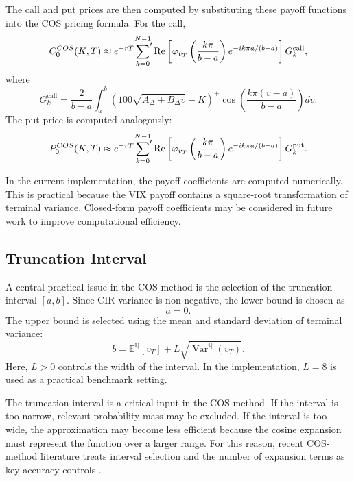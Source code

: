 The call and put prices are then computed by substituting these payoff functions into the COS pricing formula. For the call,
\begin{equation}
C_0^{COS}(K,T)
\approx
e^{-rT}
\sideset{}{'}\sum_{k=0}^{N-1}
\operatorname{Re}
\left[
\varphi_{v_T}\left(\frac{k\pi}{b-a}\right)
e^{-ik\pi a/(b-a)}
\right]
G_k^{\mathrm{call}},
\label{eq:cos_call_price}
\end{equation}
where
\begin{equation}
G_k^{\mathrm{call}}
=
\frac{2}{b-a}
\int_a^b
\left(
100\sqrt{A_\Delta+B_\Delta v}-K
\right)^+
\cos\left(
\frac{k\pi(v-a)}{b-a}
\right)
dv.
\end{equation}
The put price is computed analogously:
\begin{equation}
P_0^{COS}(K,T)
\approx
e^{-rT}
\sideset{}{'}\sum_{k=0}^{N-1}
\operatorname{Re}
\left[
\varphi_{v_T}\left(\frac{k\pi}{b-a}\right)
e^{-ik\pi a/(b-a)}
\right]
G_k^{\mathrm{put}}.
\label{eq:cos_put_price}
\end{equation}

In the current implementation, the payoff coefficients are computed numerically. This is practical because the VIX payoff contains a square-root transformation of terminal variance. Closed-form payoff coefficients may be considered in future work to improve computational efficiency.

\subsection{Truncation Interval}

A central practical issue in the COS method is the selection of the truncation interval \([a,b]\). Since CIR variance is non-negative, the lower bound is chosen as
\begin{equation}
a=0.
\end{equation}
The upper bound is selected using the mean and standard deviation of terminal variance:
\begin{equation}
b
=
\mathbb{E}^{\mathbb{Q}}[v_T]
+
L\sqrt{\operatorname{Var}^{\mathbb{Q}}(v_T)}.
\label{eq:cos_truncation}
\end{equation}
Here, \(L>0\) controls the width of the interval. In the implementation, \(L=8\) is used as a practical benchmark setting.

The truncation interval is a critical input in the COS method. If the interval is too narrow, relevant probability mass may be excluded. If the interval is too wide, the approximation may become less efficient because the cosine expansion must represent the function over a larger range. For this reason, recent COS-method literature treats interval selection and the number of expansion terms as key accuracy controls \citep{junike2022cos,junike2024cos}.

